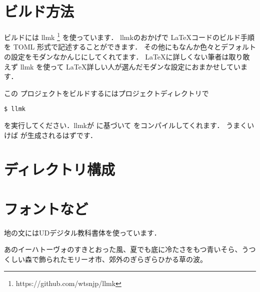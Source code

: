 \documentclass[lualatex,a4paper,ja=standard]{bxjsarticle}
\begin{document}



\section{ビルド方法}

\par ビルドには llmk \footnote{https://github.com/wtsnjp/llmk} を使っています．
llmkのおかげで \LaTeX コードのビルド手順を TOML 形式で記述することができます．
その他にもなんか色々とデフォルトの設定をモダンなかんじにしてくれてます．
\LaTeX に詳しくない筆者は取り敢えず llmk を使って \LaTeX 詳しい人が選んだモダンな設定におまかせしています．

\par この プロジェクトをビルドするにはプロジェクトディレクトリで
\begin{verbatim}
$ llmk
\end{verbatim}
を実行してください．llmkが  に基づいて  をコンパイルしてくれます．
うまくいけば  が生成されるはずです．

\section{ディレクトリ構成}


\section{フォントなど}

\par 地の文にはUDデジタル教科書体を使っています．
\par あのイーハトーヴォのすきとおった風、夏でも底に冷たさをもつ青いそら、うつくしい森で飾られたモリーオ市、郊外のぎらぎらひかる草の波。
\end{document}
